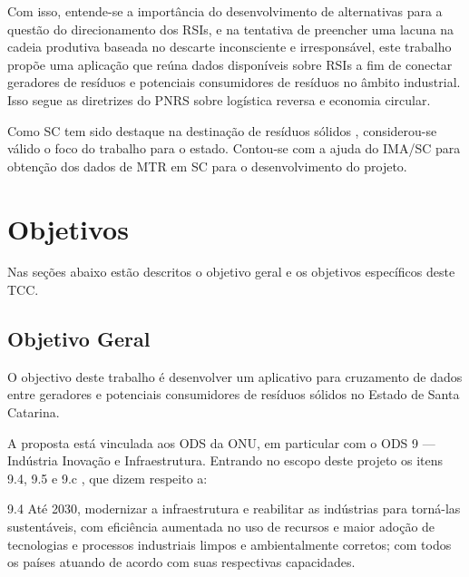 Com isso, entende-se a importância do desenvolvimento de alternativas para a questão do direcionamento dos \gls{RSI}s, e na tentativa de preencher uma lacuna na cadeia produtiva baseada no descarte inconsciente e irresponsável, este trabalho propõe uma aplicação que reúna dados disponíveis sobre \gls{RSI}s a fim de conectar geradores de resíduos e potenciais consumidores de resíduos no âmbito industrial. Isso segue as diretrizes do \gls{PNRS} sobre logística reversa e economia circular. 

Como \gls{SC} tem sido destaque na destinação de resíduos sólidos \cite{crea_sc_destino_2013}, considerou-se válido o foco do trabalho para o estado. Contou-se com a ajuda do \gls{IMA/SC} para obtenção dos dados de \gls{MTR} em \gls{SC} para o desenvolvimento do projeto.

\section{Objetivos}

Nas seções abaixo estão descritos o objetivo geral e os objetivos específicos deste \gls{TCC}.

\subsection{Objetivo Geral}

O objectivo deste trabalho é desenvolver um aplicativo para cruzamento de dados entre geradores e potenciais consumidores de resíduos sólidos no Estado de Santa Catarina. 

A proposta está vinculada aos \gls{ODS} da \gls{ONU}, em particular com o \gls{ODS} 9 — Indústria Inovação e Infraestrutura. Entrando no escopo deste projeto os itens 9.4, 9.5 e 9.c \cite{noauthor_sustainable_nodate}, que dizem respeito a:

\begin{citacao}
	9.4 Até 2030, modernizar a infraestrutura e reabilitar as indústrias para torná-las sustentáveis, com eficiência aumentada no uso de recursos e maior adoção de tecnologias e processos industriais limpos e ambientalmente corretos; com todos os países atuando de acordo com suas respectivas capacidades.
\end{citacao}

